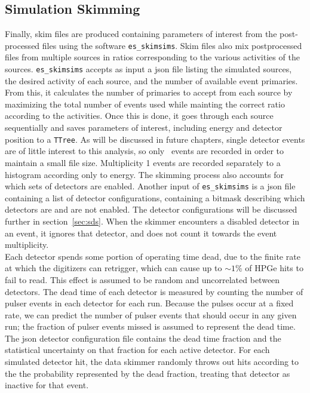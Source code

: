 \documentclass[/main.tex]{subfiles}
\begin{document}
\subsection{Simulation Skimming} \label{sec:simskim}
Finally, skim files are produced containing parameters of interest from the post-processed files using the software \texttt{es\_skimsims}.
Skim files also mix postprocessed files from multiple sources in ratios corresponding to the various activities of the sources.
\texttt{es\_skimsims} accepts as input a json file listing the simulated sources, the desired activity of each source, and the number of available event primaries.
From this, it calculates the number of primaries to accept from each source by maximizing the total number of events used while mainting the correct ratio according to the activities.
Once this is done, it goes through each source sequentially and saves parameters of interest, including energy and detector position to a \texttt{TTree}.
As will be discussed in future chapters, single detector events are of little interest to this analysis, so only \msmd\ events are recorded in order to maintain a small file size.
Multiplicity 1 events are recorded separately to a histogram according only to energy.
The skimming process also accounts for which sets of detectors are enabled.
Another input of \texttt{es\_skimsims} is a json file containing a list of detector configurations, containing a bitmask describing which detectors are and are not enabled.
The detector configurations will be discussed further in section~\ref{sec:sds}.
When the skimmer encounters a disabled detector in an event, it ignores that detector, and does not count it towards the event multiplicity.
\\
 
Each detector spends some portion of operating time dead, due to the finite rate at which the digitizers can retrigger, which can cause up to $\sim1$\% of HPGe hits to fail to read.
This effect is assumed to be random and uncorrelated between detectors.
The dead time of each detector is measured by counting the number of pulser events in each detector for each run.
Because the pulses occur at a fixed rate, we can predict the number of pulser events that should occur in any given run; the fraction of pulser events missed is assumed to represent the dead time.
The json detector configuration file contains the dead time fraction and the statistical uncertainty on that fraction for each active detector.
For each simulated detector hit, the data skimmer randomly throws out hits according to the the probability represented by the dead fraction, treating that detector as inactive for that event.
\end{document}
